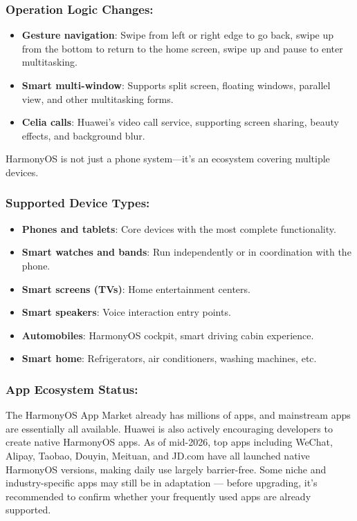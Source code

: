 \subsubsection*{Operation Logic Changes:}

\begin{itemize}
  \item \textbf{Gesture navigation}: Swipe from left or right edge to go back, swipe up from the bottom to return to the home screen, swipe up and pause to enter multitasking.
  \item \textbf{Smart multi-window}: Supports split screen, floating windows, parallel view, and other multitasking forms.
  \item \textbf{Celia calls}: Huawei's video call service, supporting screen sharing, beauty effects, and background blur.
\end{itemize}


HarmonyOS is not just a phone system—it's an ecosystem covering multiple devices.

\subsubsection*{Supported Device Types:}

\begin{itemize}
  \item \textbf{Phones and tablets}: Core devices with the most complete functionality.
  \item \textbf{Smart watches and bands}: Run independently or in coordination with the phone.
  \item \textbf{Smart screens (TVs)}: Home entertainment centers.
  \item \textbf{Smart speakers}: Voice interaction entry points.
  \item \textbf{Automobiles}: HarmonyOS cockpit, smart driving cabin experience.
  \item \textbf{Smart home}: Refrigerators, air conditioners, washing machines, etc.
\end{itemize}

\subsubsection*{App Ecosystem Status:}

The HarmonyOS App Market already has millions of apps, and mainstream apps are essentially all available. Huawei is also actively encouraging developers to create native HarmonyOS apps. As of mid-2026, top apps including WeChat, Alipay, Taobao, Douyin, Meituan, and JD.com have all launched native HarmonyOS versions, making daily use largely barrier-free. Some niche and industry-specific apps may still be in adaptation — before upgrading, it's recommended to confirm whether your frequently used apps are already supported.


